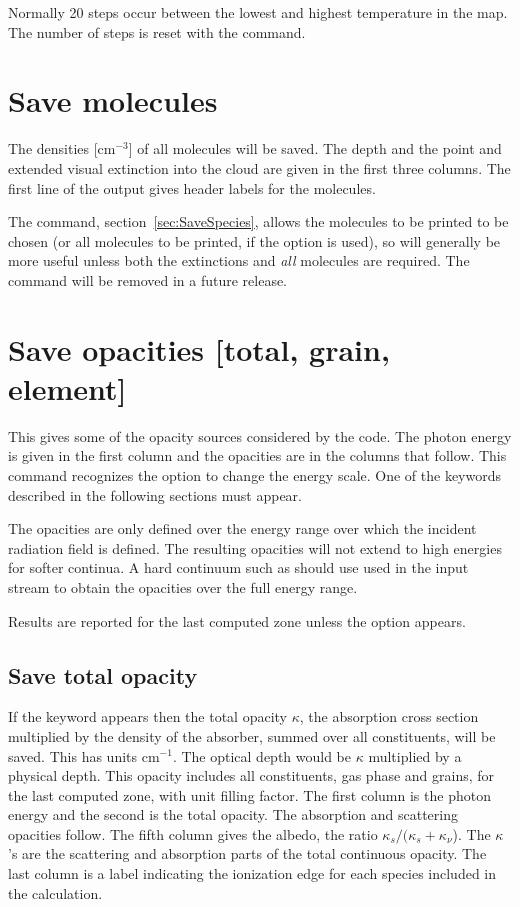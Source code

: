 Normally 20 steps occur between the lowest and highest temperature in
the map.
The number of steps is reset with the  command.

\section{Save molecules}

The densities [cm$^{-3}$] of all molecules will be saved.  The depth and
the point and extended visual extinction into the cloud are given in the
first three columns.  The first line of the output gives header labels for
the molecules.

The  command, section~\ref{sec:SaveSpecies},
allows the molecules to be printed to be chosen (or all molecules to
be printed, if the  option is used), so will generally
be more useful unless both the extinctions and {\em all}\/ molecules
are required.  The  command will be removed
in a future release.

\section{Save opacities [total, grain, element]}

This gives some of the opacity sources considered by the code. The photon
energy is given in the first column and the opacities are in the columns that
follow. This command recognizes the  option to change the
energy scale. One of the keywords described in the following sections must
appear.

The opacities are only defined over the energy range over which the incident
radiation field is defined. The resulting opacities will not extend to high energies
for softer continua. A hard continuum such as  should use
used in the input stream to obtain the opacities over the full energy range.

Results are reported for the last computed zone unless the  option
appears.

\subsection{Save total opacity}

If the keyword  appears then the total opacity $\kappa$,
the absorption
cross section multiplied by the density of the absorber, summed over all
constituents, will be saved.
This has units cm$^{-1}$.
The optical depth would
be $\kappa $ multiplied by a physical depth.  This opacity includes all constituents,
gas phase and grains, for the last computed zone, with unit filling factor.
The first column is the photon energy and the second is the total opacity.
The absorption and scattering opacities follow.  The fifth column gives
the albedo, the ratio $\kappa _s /( {\kappa _s  + \kappa _\nu  }$).   The
$\kappa $'s are the scattering and absorption parts of the total continuous
opacity.  The last column is a label indicating the ionization edge for
each species included in the calculation.

